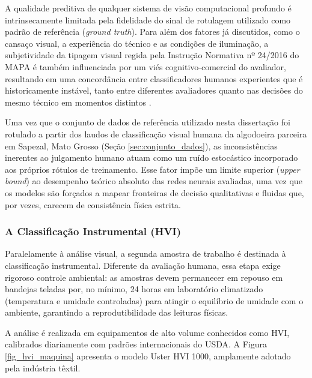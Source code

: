         A qualidade preditiva de qualquer sistema de visão computacional profundo é intrinsecamente
        limitada pela fidelidade do sinal de rotulagem utilizado como padrão de referência
        (\textit{ground truth}). Para além dos fatores já discutidos, como o cansaço visual, a experiência
        do técnico e as condições de iluminação, a subjetividade da tipagem visual regida pela
        Instrução Normativa nº 24/2016 do MAPA é também influenciada por um viés cognitivo-comercial
        do avaliador, resultando em uma concordância entre classificadores humanos experientes que é
        historicamente instável, tanto entre diferentes avaliadores quanto nas decisões do mesmo
        técnico em momentos distintos \cite{matusiak2010important, fisher2023aiassisted}.

        Uma vez que o conjunto de dados de referência utilizado nesta dissertação foi rotulado a
        partir dos laudos de classificação visual humana da algodoeira parceira em Sapezal, Mato
        Grosso (Seção \ref{sec:conjunto_dados}), as inconsistências inerentes ao julgamento humano
        atuam como um ruído estocástico incorporado aos próprios rótulos de treinamento. Esse fator
        impõe um limite superior (\textit{upper bound}) ao desempenho teórico absoluto das redes
        neurais avaliadas, uma vez que os modelos são forçados a mapear fronteiras de decisão
        qualitativas e fluidas que, por vezes, carecem de consistência física estrita.

        \clearpage

    \subsubsection{A Classificação Instrumental (HVI)}

        Paralelamente à análise visual, a segunda amostra de trabalho é destinada à classificação instrumental. Diferente da avaliação humana, essa etapa exige rigoroso controle ambiental: as amostras devem permanecer em repouso em bandejas teladas por, no mínimo, 24 horas em laboratório climatizado (temperatura e umidade controladas) para atingir o equilíbrio de umidade com o ambiente, garantindo a reprodutibilidade das leituras físicas.

        A análise é realizada em equipamentos de alto volume conhecidos como HVI, calibrados diariamente com padrões internacionais do USDA. A Figura \ref{fig_hvi_maquina} apresenta o modelo Uster HVI 1000, amplamente adotado pela indústria têxtil.

